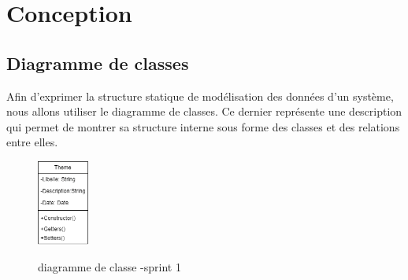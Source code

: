 \section{Conception}
\subsection{Diagramme de classes}
Afin d'exprimer la structure statique de modélisation des données d'un système, nous allons utiliser le diagramme de classes. Ce dernier représente une description qui permet de montrer sa structure interne sous forme des classes et des relations entre elles.

\begin{figure}[!h]
	\centering
	{\includegraphics[width=0.15\textwidth]{D) IMAGES/classe1.png}}
	\caption{diagramme de classe -sprint 1}
	\label{Org}
\end{figure}
\newpage

